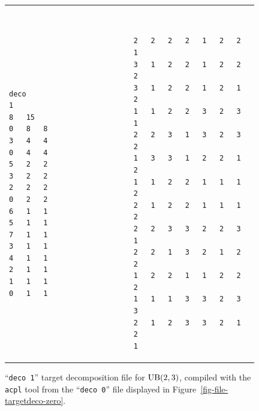 \begin{figure}[hbt]
\begin{tabular}{p{0.49\linewidth}@{}p{0.49\linewidth}}
\begin{center}
{\renewcommand{\baselinestretch}{1.05}
\footnotesize\tt
\begin{verbatim}
deco
1
8	15
0	8	8
3	4	4
0	4	4
5	2	2
3	2	2
2	2	2
0	2	2
6	1	1
5	1	1
7	1	1
3	1	1
4	1	1
2	1	1
1	1	1
0	1	1
\end{verbatim}
}
\end{center}
&
\begin{center}
{\renewcommand{\baselinestretch}{1.05}
\footnotesize\tt
\begin{verbatim}
2	2	2	2	1	2	2	1
3	1	2	2	1	2	2	2
3	1	2	2	1	2	1	2
1	1	2	2	3	2	3	1
2	2	3	1	3	2	3	2
1	3	3	1	2	2	1	2
1	1	2	2	1	1	1	2
2	1	2	2	1	1	1	2
2	2	3	3	2	2	3	1
2	2	1	3	2	1	2	2
1	2	2	1	1	2	2	2
1	1	1	3	3	2	3	3
2	1	2	3	3	2	1	2
1
\end{verbatim}
}
\end{center}
\end{tabular}
\caption{``\texttt{deco 1}'' target decomposition file for ${\rm UB}(2,3)$,
  compiled with the \texttt{acpl} tool from the ``\texttt{deco 0}''
  file displayed in Figure~\ref{fig-file-targetdeco-zero}.}
\label{fig-file-targetdeco-one}
\end{figure}
